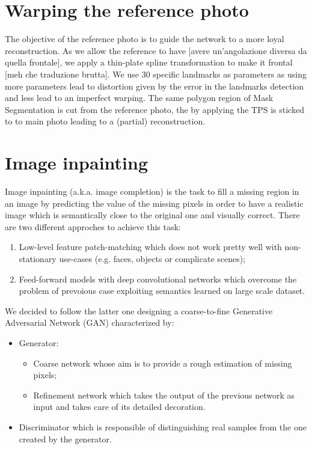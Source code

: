 \documentclass[10pt,twocolumn,letterpaper]{article}
\begin{document}
	\section{Warping the reference photo}
	The objective of the reference photo is to guide the network to a more loyal
	reconstruction. As we allow the reference to have [avere un'angolazione diversa
	da quella frontale], we apply a thin-plate spline transformation to make it frontal
	[meh che traduzione brutta]. We use 30 specific landmarks as parameters as using
	more parameters lead to distortion given by the error in the landmarks detection
	and less lead to an imperfect warping. The same polygon region of Mask
	Segmentation is cut from the reference photo, the by applying the TPS is sticked
	to to main photo leading to a (partial) reconstruction.
	
	\section{Image inpainting}
	
	Image inpainting (a.k.a. image completion) is the task to fill a missing region
	in an image by predicting the value of the missing pixels in order to have a
	realistic image which is semantically close to the original one and visually correct.
	There are two different approches to achieve this task:
	\begin{enumerate}
		\item
		Low-level feature patch-matching which does not work pretty well with non-stationary use-cases (e.g. faces, objects or complicate scenes);
		\item
		Feed-forward models with deep convolutional networks which overcome the problem of prevoious case exploiting semantics learned on large scale dataset.
	\end{enumerate}
	
	We decided to follow the latter one designing a coarse-to-fine Generative Adversarial Network (GAN) characterized by:
	\begin{itemize}
		\item
		Generator:
		\begin{itemize}
			\item 
			Coarse network whose aim is to provide a rough estimation of missing pixels;
			\item
			Refinement network which takes the output of the previous network as input and takes care of its detailed decoration.
		\end{itemize}
		\item
		Discriminator which is responsible of distinguishing real samples from the one created by the generator.
	\end{itemize}
\end{document}
